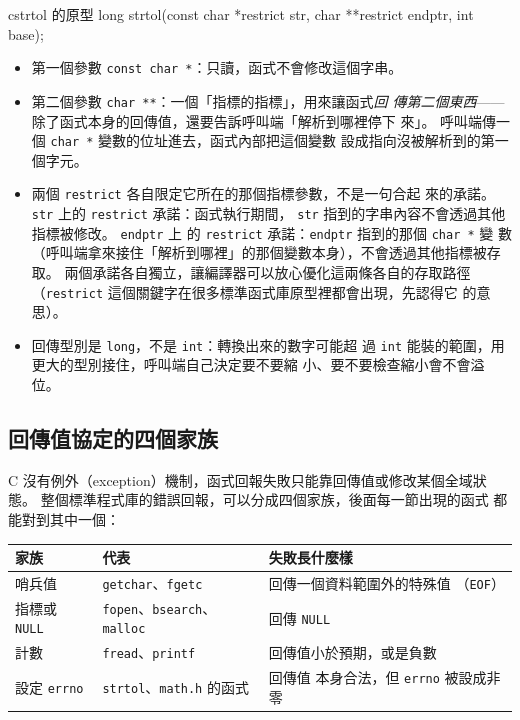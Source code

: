 \begin{code}{c}{strtol 的原型}
long strtol(const char *restrict str, char **restrict endptr, int base);
\end{code}

\begin{itemize}
\item 第一個參數 \texttt{const char *}：只讀，函式不會修改這個字串。
\item 第二個參數 \texttt{char **}：一個「指標的指標」，用來讓函式\textit{回
傳第二個東西}——除了函式本身的回傳值，還要告訴呼叫端「解析到哪裡停下
來」。 呼叫端傳一個 \texttt{char *} 變數的位址進去，函式內部把這個變數
設成指向沒被解析到的第一個字元。
\item 兩個 \texttt{restrict} 各自限定它所在的那個指標參數，不是一句合起
來的承諾。 \texttt{str} 上的 \texttt{restrict} 承諾：函式執行期間，
\texttt{str} 指到的字串內容不會透過其他指標被修改。 \texttt{endptr} 上
的 \texttt{restrict} 承諾：\texttt{endptr} 指到的那個 \texttt{char *} 變
數（呼叫端拿來接住「解析到哪裡」的那個變數本身），不會透過其他指標被存
取。 兩個承諾各自獨立，讓編譯器可以放心優化這兩條各自的存取路徑
（\texttt{restrict} 這個關鍵字在很多標準函式庫原型裡都會出現，先認得它
的意思）。
\item 回傳型別是 \texttt{long}，不是 \texttt{int}：轉換出來的數字可能超
過 \texttt{int} 能裝的範圍，用更大的型別接住，呼叫端自己決定要不要縮
小、要不要檢查縮小會不會溢位。
\end{itemize}

\subsection{回傳值協定的四個家族}

C 沒有例外（exception）機制，函式回報失敗只能靠回傳值或修改某個全域狀
態。 整個標準程式庫的錯誤回報，可以分成四個家族，後面每一節出現的函式
都能對到其中一個：

\begin{center}
\begin{tabular}{p{2.6cm}p{4.0cm}p{5.2cm}}
\toprule
家族 & 代表 & 失敗長什麼樣 \\
\midrule
哨兵值 & \texttt{getchar}、\texttt{fgetc} & 回傳一個資料範圍外的特殊值
（\texttt{EOF}） \\
指標或 \texttt{NULL} & \texttt{fopen}、\texttt{bsearch}、\texttt{malloc}
& 回傳 \texttt{NULL} \\
計數 & \texttt{fread}、\texttt{printf} & 回傳值小於預期，或是負數 \\
設定 \texttt{errno} & \texttt{strtol}、\texttt{math.h} 的函式 & 回傳值
本身合法，但 \texttt{errno} 被設成非零 \\
\bottomrule
\end{tabular}
\end{center}

